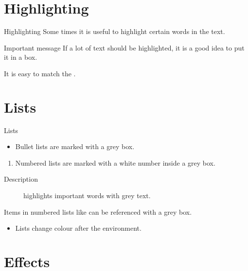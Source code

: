\documentclass[UKenglish]{beamer}
\begin{document}
\section{Highlighting}
\SectionPage


\begin{frame}{Highlighting}
    Some times it is useful to \alert{highlight} certain words in the text.
    
    \begin{alertblock}{Important message}
        If a lot of text should be \alert{highlighted}, it is a good idea to put it in a box.
    \end{alertblock}
    
    It is easy to match the .
\end{frame}


\section{Lists}


\begin{frame}{Lists}
    \begin{itemize}
        \item
        Bullet lists are marked with a grey box.
    \end{itemize}
    
    \begin{enumerate}
        \item
        \label{enum:item}
        Numbered lists are marked with a white number inside a grey box.
    \end{enumerate}

    \begin{description}
        \item[Description]
        highlights important words with grey text.
    \end{description}

    Items in numbered lists like  can be referenced with a grey box.

    \begin{example}
        \begin{itemize}
            \item
            Lists change colour after the environment.
        \end{itemize}
    \end{example}
\end{frame}


\section{Effects}
\end{document}
